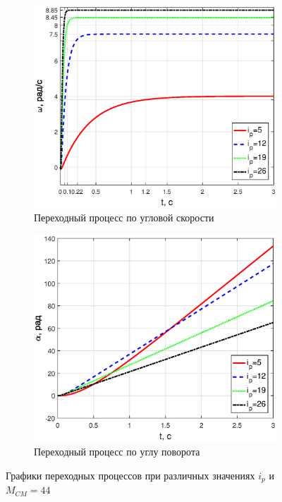 \documentclass[12pt,a4paper]{article}
\begin{document}
\begin{figure}[H]
\begin{subfigure}[b]{0.48\textwidth}
		\includegraphics[width = \textwidth]{w3_44}
		\caption{Переходный процесс по угловой скорости}
	\end{subfigure}
	\hfill
	\begin{subfigure}[b]{0.48\textwidth}
		\includegraphics[width = \textwidth]{a3_44}
		\caption{Переходный процесс по углу поворота}
	\end{subfigure}
	\caption{Графики переходных процессов при различных значениях $i_p$ и $M_{CM}=44$}
	\label{UIwa44}
\end{figure}
\end{document}
